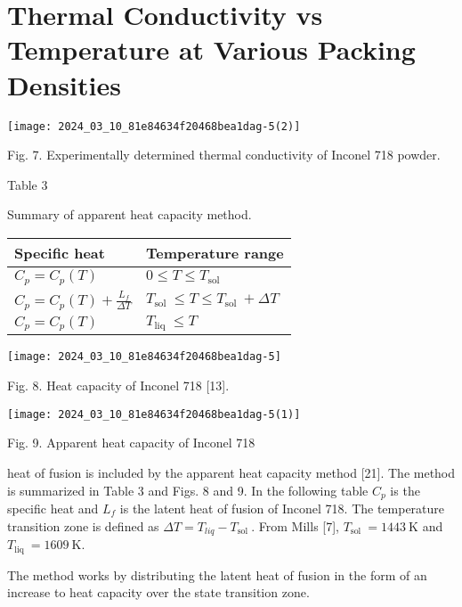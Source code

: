 \documentclass[10pt]{article}
\begin{document}
\section*{Thermal Conductivity vs Temperature at Various Packing Densities}
\begin{center}
\texttt{[image: 2024\_03\_10\_81e84634f20468bea1dag-5(2)]}
\end{center}

Fig. 7. Experimentally determined thermal conductivity of Inconel 718 powder.

Table 3

Summary of apparent heat capacity method.

\begin{center}
\begin{tabular}{ll}
\hline
Specific heat & Temperature range \\
\hline
$C_{p}=C_{p}(T)$ & $0 \leq T \leq T_{\text {sol }}$ \\
$C_{p}=C_{p}(T)+\frac{L_{f}}{\Delta T}$ & $T_{\text {sol }} \leq T \leq T_{\text {sol }}+\Delta T$ \\
$C_{p}=C_{p}(T)$ & $T_{\text {liq }} \leq T$ \\
\hline
\end{tabular}
\end{center}

\begin{center}
\texttt{[image: 2024\_03\_10\_81e84634f20468bea1dag-5]}
\end{center}

Fig. 8. Heat capacity of Inconel 718 [13].

\begin{center}
\texttt{[image: 2024\_03\_10\_81e84634f20468bea1dag-5(1)]}
\end{center}

Fig. 9. Apparent heat capacity of Inconel 718

heat of fusion is included by the apparent heat capacity method [21]. The method is summarized in Table 3 and Figs. 8 and 9. In the following table $C_{p}$ is the specific heat and $L_{f}$ is the latent heat of fusion of Inconel 718. The temperature transition zone is defined as $\Delta T=T_{l i q}-T_{\text {sol }}$. From Mills [7], $T_{\text {sol }}=1443 \mathrm{~K}$ and $T_{\text {liq }}=1609 \mathrm{~K}$.

The method works by distributing the latent heat of fusion in the form of an increase to heat capacity over the state transition zone.
\end{document}
